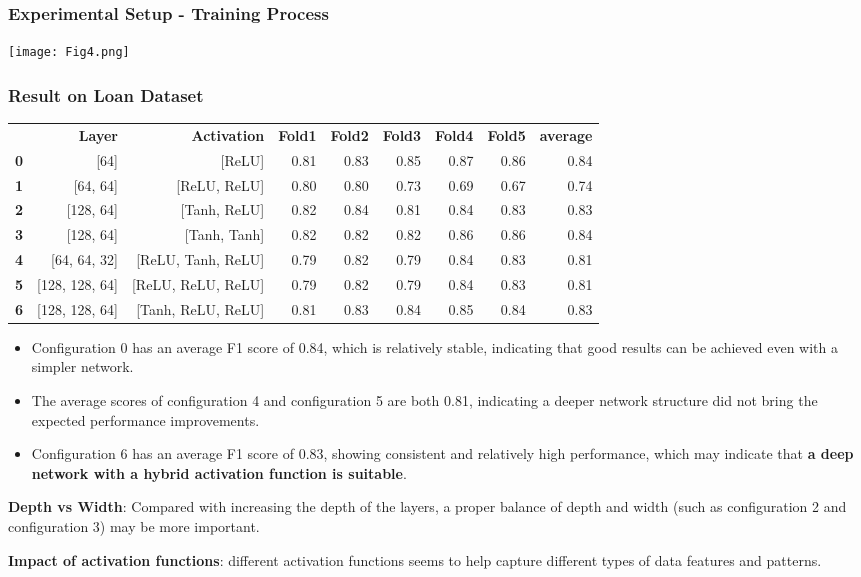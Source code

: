 \documentclass[10pt]{beamer}
\begin{document}
\begin{frame}
\frametitle{Experimental Setup - Training Process}
\texttt{[image: Fig4.png]}
\end{frame}

\begin{frame}
\frametitle{Result on Loan Dataset}
\begin{table}
\centering
\tiny
\begin{tabularx}{\textwidth}{rrrrrrrrr}
 & \textbf{Layer} & \textbf{Activation} & \textbf{Fold1} & \textbf{Fold2} & \textbf{Fold3} & \textbf{Fold4} & \textbf{Fold5} & \textbf{average} \\
\textbf{0} & [64] & [ReLU] & 0.81 & 0.83 & 0.85 & 0.87 & 0.86 & 0.84 \\
\textbf{1} & [64, 64] & [ReLU, ReLU] & 0.80 & 0.80 & 0.73 & 0.69 & 0.67 & 0.74 \\
\textbf{2} & [128, 64] & [Tanh, ReLU] & 0.82 & 0.84 & 0.81 & 0.84 & 0.83 & 0.83 \\
\textbf{3} & [128, 64] & [Tanh, Tanh] & 0.82 & 0.82 & 0.82 & 0.86 & 0.86 & 0.84 \\
\textbf{4} & [64, 64, 32] & [ReLU, Tanh, ReLU] & 0.79 & 0.82 & 0.79 & 0.84 & 0.83 & 0.81 \\
\textbf{5} & [128, 128, 64] & [ReLU, ReLU, ReLU] & 0.79 & 0.82 & 0.79 & 0.84 & 0.83 & 0.81 \\
\textbf{6} & [128, 128, 64] & [Tanh, ReLU, ReLU] & 0.81 & 0.83 & 0.84 & 0.85 & 0.84 & 0.83
\end{tabularx}
\end{table}
\scriptsize
\begin{itemize}
\item Configuration 0 has an average F1 score of 0.84, which is relatively stable, indicating that good results can be achieved even with a simpler network.
\item The average scores of configuration 4 and configuration 5 are both 0.81, indicating a deeper network structure did not bring the expected performance improvements.
\item Configuration 6 has an average F1 score of 0.83, showing consistent and relatively high performance, which may indicate that \textbf{a deep network with a hybrid activation function is suitable}.
\end{itemize}

\textbf{Depth vs Width}: Compared with increasing the depth of the layers, a proper balance of depth and width (such as configuration 2 and configuration 3) may be more important.

\textbf{Impact of activation functions}: different activation functions seems to help capture different types of data features and patterns.
\end{frame}
\end{document}
